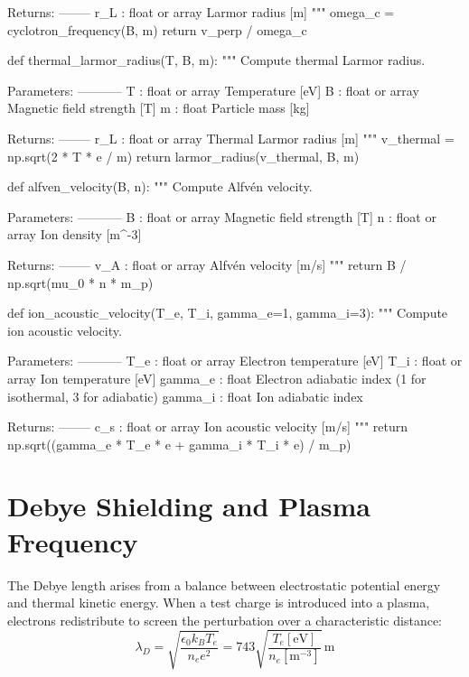 \documentclass[11pt,a4paper]{article}
\begin{document}
\begin{pycode}
    Returns:
    --------
    r_L : float or array
        Larmor radius [m]
    """
    omega_c = cyclotron_frequency(B, m)
    return v_perp / omega_c

def thermal_larmor_radius(T, B, m):
    """
    Compute thermal Larmor radius.

    Parameters:
    -----------
    T : float or array
        Temperature [eV]
    B : float or array
        Magnetic field strength [T]
    m : float
        Particle mass [kg]

    Returns:
    --------
    r_L : float or array
        Thermal Larmor radius [m]
    """
    v_thermal = np.sqrt(2 * T * e / m)
    return larmor_radius(v_thermal, B, m)

def alfven_velocity(B, n):
    """
    Compute Alfvén velocity.

    Parameters:
    -----------
    B : float or array
        Magnetic field strength [T]
    n : float or array
        Ion density [m^-3]

    Returns:
    --------
    v_A : float or array
        Alfvén velocity [m/s]
    """
    return B / np.sqrt(mu_0 * n * m_p)

def ion_acoustic_velocity(T_e, T_i, gamma_e=1, gamma_i=3):
    """
    Compute ion acoustic velocity.

    Parameters:
    -----------
    T_e : float or array
        Electron temperature [eV]
    T_i : float or array
        Ion temperature [eV]
    gamma_e : float
        Electron adiabatic index (1 for isothermal, 3 for adiabatic)
    gamma_i : float
        Ion adiabatic index

    Returns:
    --------
    c_s : float or array
        Ion acoustic velocity [m/s]
    """
    return np.sqrt((gamma_e * T_e * e + gamma_i * T_i * e) / m_p)

\end{pycode}

\section{Debye Shielding and Plasma Frequency}

The Debye length arises from a balance between electrostatic potential energy and thermal kinetic energy. When a test charge is introduced into a plasma, electrons redistribute to screen the perturbation over a characteristic distance:
\begin{equation}
\lambda_D = \sqrt{\frac{\epsilon_0 k_B T_e}{n_e e^2}} = 743 \sqrt{\frac{T_e[\text{eV}]}{n_e[\text{m}^{-3}]}} \, \text{m}
\end{equation}
\end{document}
